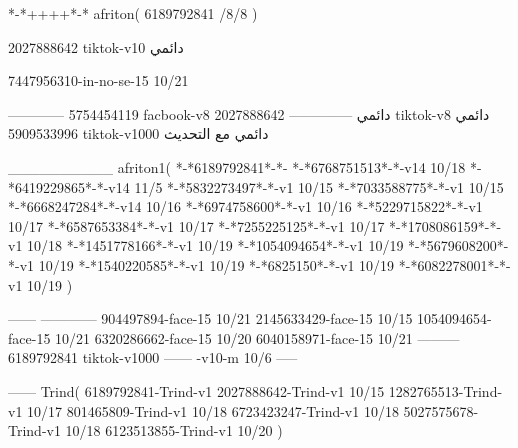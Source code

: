 *-*++++*-*
afriton(
6189792841 /8/8
)

2027888642 tiktok-v10
دائمي


7447956310-in-no-se-15 10/21

------------
5754454119 facbook-v8
دائمي
--------------
2027888642 tiktok-v8
دائمي
5909533996 tiktok-v1000
دائمي مع التحديث

__________
afriton1(
*-*6189792841*-*-
*-*6768751513*-*-v14 10/18
*-*6419229865*-*-v14 11/5
*-*5832273497*-*-v1 10/15
*-*7033588775*-*-v1 10/15
*-*6668247284*-*-v14 10/16
*-*6974758600*-*-v1 10/16
*-*5229715822*-*-v1 10/17
*-*6587653384*-*-v1 10/17
*-*7255225125*-*-v1 10/17
*-*1708086159*-*-v1 10/18
*-*1451778166*-*-v1 10/19
*-*1054094654*-*-v1 10/19
*-*5679608200*-*-v1 10/19
*-*1540220585*-*-v1 10/19
*-*6825150*-*-v1 10/19
*-*6082278001*-*-v1 10/19
)

------
------------
904497894-face-15 10/21
2145633429-face-15 10/15
1054094654-face-15 10/21
6320286662-face-15 10/20
6040158971-face-15 10/21
---------
6189792841 tiktok-v1000
------
-v10-m 10/6
-----

------
Trind(
6189792841-Trind-v1 
2027888642-Trind-v1 10/15
1282765513-Trind-v1 10/17
801465809-Trind-v1 10/18
6723423247-Trind-v1 10/18
5027575678-Trind-v1 10/18
6123513855-Trind-v1 10/20
)
